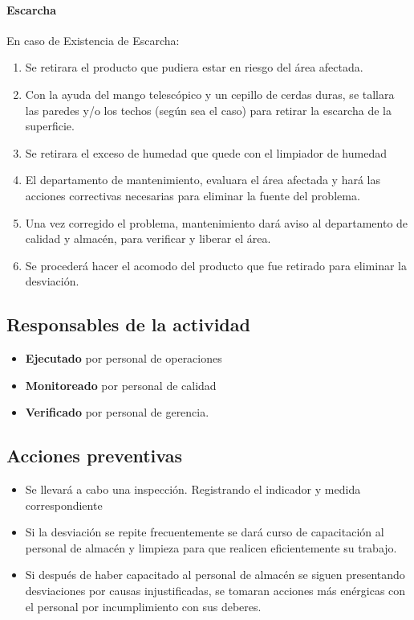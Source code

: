 \paragraph{Escarcha}

En caso de Existencia de Escarcha:

\begin{enumerate}
	\item Se retirara el producto que pudiera estar en riesgo del área afectada.
	\item Con la ayuda del mango telescópico y un cepillo de cerdas duras, se tallara las paredes y/o los techos (según sea el caso) para retirar la escarcha de la superficie.
	\item Se retirara el exceso de humedad que quede con el limpiador de humedad
	\item El departamento de mantenimiento, evaluara el área afectada y hará las acciones correctivas necesarias para eliminar la fuente del problema.
	\item Una vez corregido el problema, mantenimiento dará aviso al departamento de calidad y almacén, para verificar y liberar el área.
	\item Se procederá hacer el acomodo del producto que fue retirado para eliminar la desviación.
\end{enumerate}

\subsection{Responsables de la actividad}

\begin{itemize}
	\item \textbf{Ejecutado} por personal de operaciones
	\item \textbf{Monitoreado} por personal de calidad
	\item \textbf{Verificado} por personal de gerencia.
\end{itemize}

\subsection{Acciones preventivas}

\begin{itemize}
	\item Se llevará a cabo una inspección. Registrando el indicador y medida correspondiente
	\item Si la desviación se repite frecuentemente se dará curso de capacitación al personal de almacén y limpieza para que realicen eficientemente su trabajo.
	\item Si después de haber capacitado al personal de almacén se siguen presentando desviaciones por causas injustificadas, se tomaran acciones más enérgicas con el personal por incumplimiento con sus deberes.
\end{itemize}

